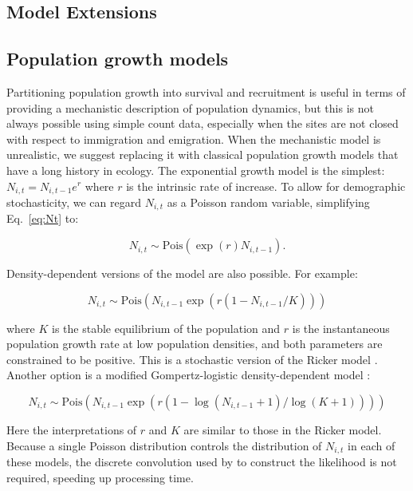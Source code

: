 \documentclass[12pt,english]{article}
\begin{document}
\begin{spacing}{1.9}
\begin{flushleft}
\section*{Model Extensions}
\label{sec:ext}
\subsection*{Population growth models}
Partitioning population growth into survival and recruitment
is useful  
in terms of providing a mechanistic description of population
dynamics, but this is not always possible using simple count data,
especially when the sites are not closed with respect to immigration
and emigration. 
When the mechanistic model is unrealistic, we suggest replacing it
with classical population growth models that have a long history in ecology.
The exponential growth model is the simplest: 
$N_{i,t} = N_{i,t-1}e^r$ where $r$ is the intrinsic
rate of increase. 
To allow for demographic stochasticity, we can regard $N_{i,t}$ as a Poisson 
random variable, simplifying Eq.~\ref{eq:Nt} to:
\begin{linenomath*}
\begin{equation}
  N_{i,t} \sim \mathrm{Pois}(\exp(r)N_{i,t-1}).
\label{eq:exp}
\end{equation}
\end{linenomath*}

Density-dependent versions of the model are also possible.  For
example:
\begin{linenomath*}
\begin{equation}
  N_{i,t} \sim \mathrm{Pois}(N_{i,t-1}\exp(r(1-N_{i,t-1}/K)))
\label{eq:rick}
\end{equation}
\end{linenomath*}
where $K$ is the stable equilibrium of the population and $r$ is
the instantaneous population growth rate at low population
densities, and both parameters are constrained to be positive. This is
a stochastic version of the 
Ricker model \citep{ricker:1954}. Another option is a 
modified Gompertz-logistic
density-dependent model \citep[henceforth Gompertz model,][]{hart_gotelli:2011}:
\begin{linenomath*}
\begin{equation}
N_{i,t} \sim \mathrm{Pois}(N_{i,t-1}\exp(r(1-\log(N_{i,t-1}+1)/\log(K+1))))
\label{eq:gomp}
\end{equation}
\end{linenomath*}
Here the interpretations of $r$ and $K$ are similar to those in the
Ricker model. Because a single Poisson distribution controls
the distribution of $N_{i,t}$ in each of these models, the discrete 
convolution used by \citet{dail_madsen:2011} to construct the
likelihood is not required, speeding up processing time.


\end{flushleft}
\end{spacing}
\end{document}
